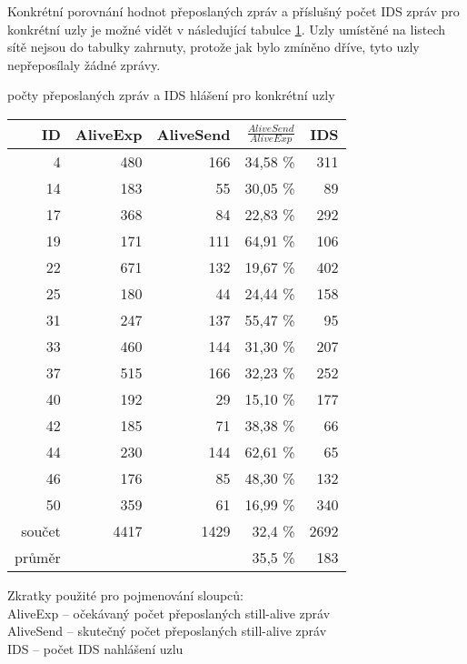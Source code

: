 \documentclass[11pt,final,twoside]{fithesis2}
\begin{document}
Konkrétní porovnání hodnot přeposlaných zpráv a příslušný počet IDS zpráv pro konkrétní uzly je možné vidět v následující tabulce 
\ref{tab:ids}. Uzly umístěné na listech sítě nejsou do tabulky zahrnuty, protože jak 
bylo zmíněno dříve, tyto uzly nepřeposílaly žádné zprávy. 

\begin {table}[h]
\caption {počty přeposlaných zpráv a IDS hlášení pro konkrétní uzly} \label{tab:ids} 
\begin{center}
\begin{tabular}{rrrrr}

ID  & AliveExp &  AliveSend & $\frac{AliveSend}{AliveExp}$& IDS \\
\hline
4   &        480  &        166  &        34,58 \%  &        311 \\
14  &        183  &        55   &        30,05 \%  &        89  \\
17  &        368  &        84   &        22,83 \%  &        292 \\
19  &        171  &        111  &        64,91 \%  &        106 \\
22  &        671  &        132  &        19,67 \%  &        402 \\
25  &        180  &        44   &        24,44 \%  &        158 \\
31  &        247  &        137  &        55,47 \%  &        95 \\
33  &        460  &        144  &        31,30 \%  &        207 \\
37  &        515  &        166  &        32,23 \%  &        252 \\
40  &        192  &        29   &        15,10 \%  &        177 \\
42  &        185  &        71   &        38,38 \%  &        66 \\
44  &        230  &        144  &        62,61 \%  &        65 \\
46  &        176  &        85   &        48,30 \%  &        132 \\
50  &        359  &        61   &        16,99 \%  &        340 \\
\hline
\hline
součet &        4417 &        1429 &        32,4 \%   &        2692 \\
průměr &             &             &        35,5 \%  &        183 \\
\end{tabular}
\bigskip
\caption*{Zkratky použité pro pojmenování sloupců:\\
	  AliveExp -- očekávaný počet přeposlaných still-alive zpráv \\
	  AliveSend -- skutečný počet přeposlaných still-alive zpráv \\	  
	  IDS -- počet IDS nahlášení uzlu}
\end{center}
\end {table}
\end{document}
